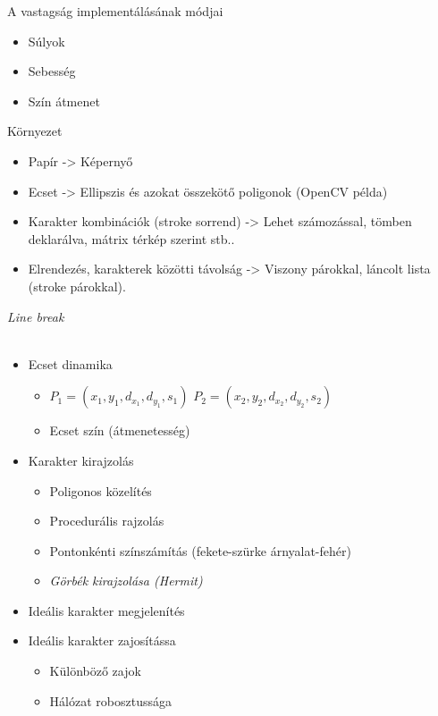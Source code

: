 A vastagság implementálásának módjai
\begin{itemize}
\item Súlyok 

\item Sebesség 

\item Szín átmenet 


\end{itemize}

Környezet
\begin{itemize}
\item Papír -> Képernyő
\item Ecset -> Ellipszis és azokat összekötő poligonok (OpenCV példa)
\item Karakter kombinációk (stroke sorrend) -> Lehet számozással, tömben deklarálva, mátrix térkép szerint stb..
\item Elrendezés, karakterek közötti távolság -> Viszony párokkal, láncolt lista (stroke párokkal).
\end{itemize}

\textit{Line break}\\\\

\begin{itemize}
\item Ecset dinamika
	\begin{itemize}
	\item \(P_1 = (x_1, y_1, d_{x_1}, d_{y_1}, s_1)\) \(P_2 = (x_2, y_2, d_{x_2}, d_{y_2}, s_2)\)
	\item Ecset szín (átmenetesség)
	\end{itemize}
\item Karakter kirajzolás
	\begin{itemize}
	\item Poligonos közelítés
	\item Procedurális rajzolás
	\item Pontonkénti színszámítás (fekete-szürke árnyalat-fehér)
	\item \textit{Görbék kirajzolása (Hermit)}
	\end{itemize}
\item Ideális karakter megjelenítés
\item Ideális karakter zajosítássa
	\begin{itemize}
	\item Különböző zajok
	\item Hálózat robosztussága
	\end{itemize}
\end{itemize}

\begin{comment}{Dolgozok a Hermit-es részen.}
\end{comment}

\begin{comment}{Ezek így vázlatnak jók, viszont az egyes pontokból legalább külön-külön szakaszoknak kellene majd lenni!}
\end{comment}
